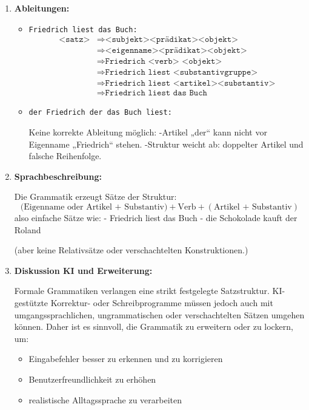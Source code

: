 \documentclass[a4paper,12pt]{article}
\begin{document}
	\begin{enumerate}
		\item \textbf{Ableitungen:}
		\begin{itemize}
			\item \texttt{Friedrich liest das Buch:}
			\[
			\begin{aligned}
				\texttt{<satz>} &\Rightarrow \texttt{<subjekt><prädikat><objekt>} \\
				&\Rightarrow \texttt{<eigenname><prädikat><objekt>} \\
				&\Rightarrow \texttt{Friedrich <verb> <objekt>} \\
				&\Rightarrow \texttt{Friedrich liest <substantivgruppe>} \\
				&\Rightarrow \texttt{Friedrich liest <artikel><substantiv>} \\
				&\Rightarrow \texttt{Friedrich liest das Buch}
			\end{aligned}
			\]
			
			\item \texttt{der Friedrich der das Buch liest:}
			
			Keine korrekte Ableitung möglich:  
			-Artikel „der“ kann nicht vor Eigenname „Friedrich“ stehen.  
			-Struktur weicht ab: doppelter Artikel und falsche Reihenfolge.
		\end{itemize}
		
		\item \textbf{Sprachbeschreibung:}
		
		Die Grammatik erzeugt Sätze der Struktur:  
		\[
		\text{(Eigenname oder Artikel + Substantiv)} + \text{Verb} + (\text{Artikel + Substantiv})
		\]
		also einfache Sätze wie:
		- Friedrich liest das Buch
		- die Schokolade kauft der Roland
		
		(aber keine Relativsätze oder verschachtelten Konstruktionen.)
		
		\item \textbf{Diskussion KI und Erweiterung:}
		
		Formale Grammatiken verlangen eine strikt festgelegte Satzstruktur.  
		KI-gestützte Korrektur- oder Schreibprogramme müssen jedoch auch mit umgangssprachlichen, ungrammatischen oder verschachtelten Sätzen umgehen können.  
		Daher ist es sinnvoll, die Grammatik zu erweitern oder zu lockern, um:
		\begin{itemize}
			\item Eingabefehler besser zu erkennen und zu korrigieren
			\item Benutzerfreundlichkeit zu erhöhen
			\item realistische Alltagssprache zu verarbeiten
		\end{itemize}
	\end{enumerate}
	
	
\end{document}
